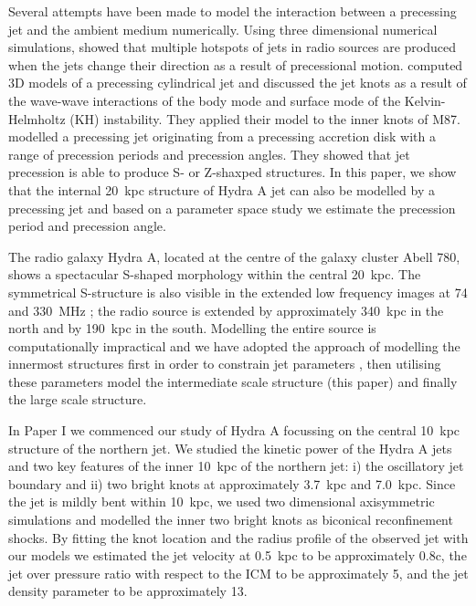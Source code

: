 \documentclass[useAMS, usenatbib]{mn2e}
\begin{document}
Several attempts have been made to model the interaction between a precessing jet and the ambient medium numerically. Using three dimensional numerical simulations, \citet{cox91} showed that multiple hotspots of jets in radio sources are produced when the jets change their direction as a result of precessional motion. \citet{hardee01} computed 3D models of a precessing cylindrical jet and discussed the jet knots as a result of the wave-wave interactions of the body mode and surface mode of the Kelvin-Helmholtz (KH) instability. They applied their model to the inner knots of M87. \citet{kurosawa08} modelled a precessing jet originating from a precessing accretion disk with a range of precession periods and precession angles. They showed that jet precession is able to produce S- or Z-shaxped structures. In this paper, we show that the internal 20~kpc structure of Hydra A jet can also be modelled by a precessing jet and based on a parameter space study we estimate the precession period and precession angle.
 
The radio galaxy Hydra A, located at the centre of the galaxy cluster Abell 780, shows a spectacular S-shaped morphology within the central 20~kpc. The symmetrical S-structure is also visible in the extended low frequency images at 74 and 330~MHz \citep{lane04}; the radio source is extended by approximately 340~kpc in the north and by 190~kpc in the south. Modelling the entire source is computationally impractical and we have adopted the approach of modelling the innermost structures first in order to constrain jet parameters \citep[][hereafter Paper I]{nawaz14a}, then utilising these parameters model the intermediate scale structure (this paper) and finally the large scale structure. 

In Paper I we commenced our study of Hydra A focussing on the central 10~kpc structure of the northern jet. We studied the kinetic power of the Hydra A jets and two key features of the inner 10~kpc of the northern jet: i) the oscillatory jet boundary and ii) two bright knots at approximately 3.7~kpc and 7.0~kpc. Since the jet is mildly bent within 10~kpc, we used two dimensional axisymmetric simulations and modelled the inner two bright knots as biconical reconfinement shocks. By fitting the knot location and the radius profile of the observed jet with our models we estimated the jet velocity at 0.5~kpc to be approximately 0.8c, the jet over pressure ratio  with respect to the ICM to be approximately 5, and the jet density parameter to be approximately 13. 
\end{document}
